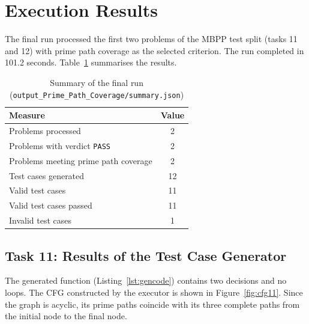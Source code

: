\documentclass[11pt, a4paper]{article}
\begin{document}
\section{Execution Results}
\label{sec:results}

The final run processed the first two problems of the MBPP test split (tasks 11 and 12) with prime path coverage as the selected criterion. The run completed in 101.2 seconds. Table~\ref{tab:summary} summarises the results.

\begin{table}[H]
    \centering
    \small
    \begin{tabular}{lc}
        \toprule
        \textbf{Measure} & \textbf{Value} \\
        \midrule
        Problems processed & 2 \\
        Problems with verdict \texttt{PASS} & 2 \\
        Problems meeting prime path coverage & 2 \\
        Test cases generated & 12 \\
        Valid test cases & 11 \\
        Valid test cases passed & 11 \\
        Invalid test cases & 1 \\
        \bottomrule
    \end{tabular}
    \caption{Summary of the final run (\texttt{output\_Prime\_Path\_Coverage/summary.json})}
    \label{tab:summary}
\end{table}

\subsection{Task 11: Results of the Test Case Generator}

The generated function (Listing~\ref{lst:gencode}) contains two decisions and no loops. The CFG constructed by the executor is shown in Figure~\ref{fig:cfg11}. Since the graph is acyclic, its prime paths coincide with its three complete paths from the initial node to the final node.
\end{document}
